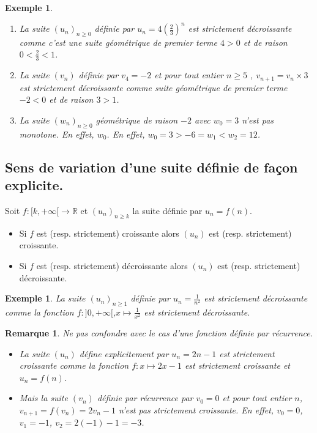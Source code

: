 \documentclass[a4paper,11pt]{article}
\theoremstyle{break}
\newcounter{enonce}
\newtheorem{Rq}[enonce]{Remarque}
\newtheorem{exemple}[enonce]{Exemple}
\begin{document}
 \begin{exemple}
    
    \begin{enumerate}
     \item La suite $(u_n)_{n \geq 0}$ définie par $u_n=4(\frac{2}{3})^n$ est strictement décroissante comme 
     c'est une suite géométrique de premier terme $4>0$ et de raison $0<\frac{2}{3}<1$.
     \item La suite $(v_n)$ définie par $v_4=-2$ et pour tout entier $n \geq 5$
     , $v_{n+1}=v_n \times 3$ est strictement décroissante comme suite géométrique de premier
     terme $-2<0$ et de raison $3>1$.
     \item La suite $(w_n)_{n \geq 0}$ géométrique de raison $-2$ avec $w_0=3$ n'est pas monotone. En effet,
     $w_0$. En effet, $w_0=3>-6=w_1<w_2=12$.
    \end{enumerate}
 \end{exemple}

 \subsection{Sens de variation d'une suite définie de façon explicite.}
 
  \begin{theorem}
  Soit $f:[k,+\infty[ \to \mathbb{R}$ et $(u_n)_{n \geq k}$ la suite définie par $u_n=f(n)$.
  \begin{itemize}
   \item Si $f$ est (resp. strictement) croissante alors $(u_n)$ est (resp. strictement) croissante.
   \item Si $f$ est (resp. strictement) décroissante alors $(u_n)$ est (resp. strictement) décroissante.
 \end{itemize}
 \end{theorem}
 
 \begin{exemple}
 La suite $(u_n)_{n \geq 1}$ définie par $u_n=\frac{1}{n^2}$ est strictement décroissante comme 
     la fonction $f:]0,+\infty[$,$x \mapsto \frac{1}{x^2}$ est strictement décroissante.
\end{exemple}

\begin{Rq}
 Ne pas confondre avec le cas d'une fonction définie par récurrence.
 \begin{itemize}
  \item La suite $(u_n)$ défine explicitement par $u_n=2n-1$ est strictement croissante comme la fonction 
 $f:x \mapsto 2x-1$ est strictement croissante et $u_n=f(n)$.
 \item Mais la suite $(v_n)$ définie par récurrence par $v_0=0$ et pour tout entier $n$, $v_{n+1}=f(v_n)=2 v_n-1$ 
 n'est pas strictement croissante. En effet, $v_0=0$, $v_1=-1$, $v_2=2(-1)-1=-3$. 
 \end{itemize}

 
 
\end{Rq}
\end{document}
